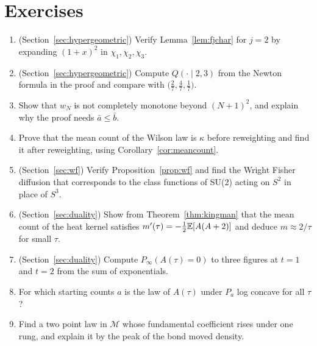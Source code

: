 \section*{Exercises}
\begin{enumerate}
\item (Section~\ref{sec:hypergeometric}) Verify Lemma~\ref{lem:fjchar} for $j=2$ by expanding $(1+x)^2$ in $\chi_1,\chi_2,\chi_3$.
\item (Section~\ref{sec:hypergeometric}) Compute $Q(\cdot\mid2,3)$ from the Newton formula in the proof and compare with $\big(\frac27,\frac47,\frac17\big)$.
\item Show that $w_N$ is not completely monotone beyond $(N+1)^2$, and explain why the proof needs $\bar a\le\bar b$.
\item Prove that the mean count of the Wilson law is $\kappa$ before reweighting and find it after reweighting, using Corollary~\ref{cor:meancount}.
\item (Section~\ref{sec:wf}) Verify Proposition~\ref{prop:wf} and find the Wright Fisher diffusion that corresponds to the class functions of SU(2) acting on $S^2$ in place of $S^3$.
\item (Section~\ref{sec:duality}) Show from Theorem~\ref{thm:kingman} that the mean count of the heat kernel satisfies $m'(\tau)=-\frac12\mathbb{E}[A(A+2)]$ and deduce $m\approx2/\tau$ for small $\tau$.
\item (Section~\ref{sec:duality}) Compute $P_\infty(A(\tau)=0)$ to three figures at $t=1$ and $t=2$ from the sum of exponentials.
\item For which starting counts $a$ is the law of $A(\tau)$ under $P_a$ log concave for all $\tau$?
\item Find a two point law in $\mathcal M$ whose fundamental coefficient rises under one rung, and explain it by the peak of the bond moved density.
\end{enumerate}
